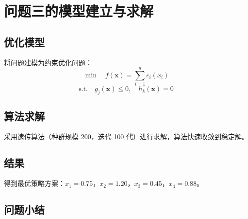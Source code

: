 \section{问题三的模型建立与求解}

\subsection{优化模型}

将问题建模为约束优化问题：
\[
  \min \quad f(\mathbf{x}) = \sum_{i=1}^{n} c_i(x_i)
\]
\[
  \text{s.t.} \quad g_j(\mathbf{x}) \le 0, \quad h_k(\mathbf{x}) = 0
\]

\subsection{算法求解}

采用遗传算法（种群规模 200，迭代 100 代）进行求解，算法快速收敛到稳定解。

\subsection{结果}

得到最优策略方案：$x_1 = 0.75$，$x_2 = 1.20$，$x_3 = 0.45$，$x_4 = 0.88$。

\subsection{问题小结}

